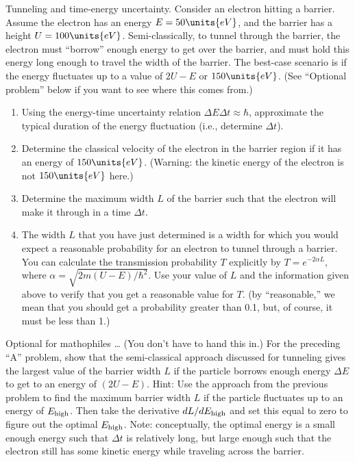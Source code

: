 \begin{aproblem}{Tunneling and time-energy uncertainty.}  
  Consider an electron hitting a barrier.  Assume the electron has an
  energy $E = 50\units{eV}$, and the barrier has a height $U =
  100\units{eV}$.  Semi-classically, to tunnel through the barrier,
  the electron must ``borrow'' enough energy to get over the barrier,
  and must hold this energy long enough to travel the width of the
  barrier.  The best-case scenario is if the energy fluctuates up to a
  value of $2U - E$ or $150\units{eV}$.  (See ``Optional problem''
  below if you want to see where this comes
  from.) \label{prob:tunneltime}

  \begin{enumerate}
  \item Using the energy-time uncertainty relation $\Delta E \Delta t
    \approx \hbar$, approximate the typical duration of the energy
    fluctuation (i.e., determine $\Delta t$).
  \item Determine the classical velocity of the electron in the
    barrier region if it has an energy of $150\units{eV}$.  (Warning:
    the kinetic energy of the electron is not $150\units{eV}$ here.)
  \item Determine the maximum width $L$ of the barrier such that the
    electron will make it through in a time $\Delta t$.
  \item The width $L$ that you have just determined is a width for
    which you would expect a reasonable probability for an electron to
    tunnel through a barrier.  You can calculate the transmission
    probability $T$ explicitly by $T = e^{-2\alpha L}$, where $\alpha
    = \sqrt{2m(U-E)/\hbar^2}$.  Use your value of $L$ and the
    information given above to verify that you get a reasonable value
    for $T$. (by ``reasonable,'' we mean that you should get a
    probability greater than 0.1, but, of course, it must be less than
    1.)
  \end{enumerate}
\end{aproblem}


\begin{aproblem}{Optional for mathophiles \dots} 
  (You don't have to hand this in.)  For the preceding ``A'' problem,
  show that the semi-classical approach discussed for tunneling gives
  the largest value of the barrier width $L$ if the particle borrows
  enough energy $\Delta E$ to get to an energy of $(2U - E)$. Hint:
  Use the approach from the previous problem to find the maximum
  barrier width $L$ if the particle fluctuates up to an energy of
  $E_{\rm high}$.  Then take the derivative $dL/dE_{\rm high}$ and set
  this equal to zero to figure out the optimal $E_{\rm high}$.  Note:
  conceptually, the optimal energy is a small enough energy such that
  $\Delta t$ is relatively long, but large enough such that the
  electron still has some kinetic energy while traveling across the
  barrier.
\end{aproblem}


